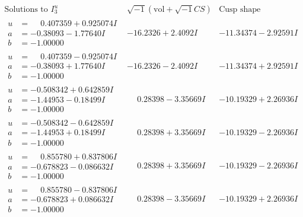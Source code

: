 \documentclass[1p]{elsarticle_modified}
\theoremstyle{definition}
\newcommand{\I}{\sqrt{-1}}
\begin{document}
$$\begin{array}{c|c|c}  
\text{Solutions to }I^u_{3}& \I (\text{vol} + \sqrt{-1}CS) & \text{Cusp shape}\\
 \hline 
\begin{aligned}
u &= \phantom{-}0.407359 + 0.925074 I \\
a &= -0.38093 - 1.77640 I \\
b &= -1.00000\phantom{ +0.000000I}\end{aligned}
 & -16.2326 + 2.4092 I & -11.34374 - 2.92591 I \\ \hline\begin{aligned}
u &= \phantom{-}0.407359 - 0.925074 I \\
a &= -0.38093 + 1.77640 I \\
b &= -1.00000\phantom{ +0.000000I}\end{aligned}
 & -16.2326 - 2.4092 I & -11.34374 + 2.92591 I \\ \hline\begin{aligned}
u &= -0.508342 + 0.642859 I \\
a &= -1.44953 - 0.18499 I \\
b &= -1.00000\phantom{ +0.000000I}\end{aligned}
 & \phantom{-}0.28398 - 3.35669 I & -10.19329 + 2.26936 I \\ \hline\begin{aligned}
u &= -0.508342 - 0.642859 I \\
a &= -1.44953 + 0.18499 I \\
b &= -1.00000\phantom{ +0.000000I}\end{aligned}
 & \phantom{-}0.28398 + 3.35669 I & -10.19329 - 2.26936 I \\ \hline\begin{aligned}
u &= \phantom{-}0.855780 + 0.837806 I \\
a &= -0.678823 - 0.086632 I \\
b &= -1.00000\phantom{ +0.000000I}\end{aligned}
 & \phantom{-}0.28398 + 3.35669 I & -10.19329 - 2.26936 I \\ \hline\begin{aligned}
u &= \phantom{-}0.855780 - 0.837806 I \\
a &= -0.678823 + 0.086632 I \\
b &= -1.00000\phantom{ +0.000000I}\end{aligned}
 & \phantom{-}0.28398 - 3.35669 I & -10.19329 + 2.26936 I \\ \hline\begin{aligned}

\end{aligned}
\end{array}$$
\end{document}
